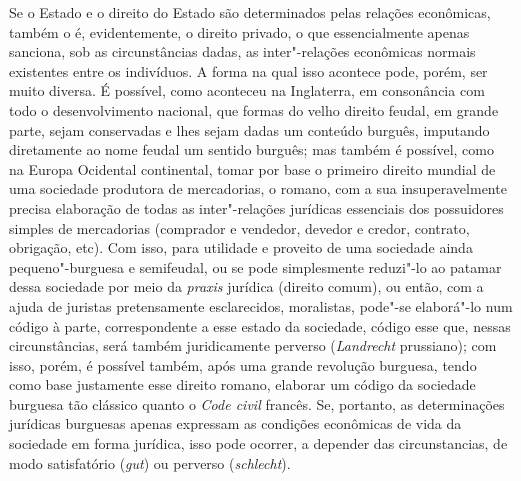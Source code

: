 Se o Estado e o direito do Estado são determinados pelas relações
econômicas, também o é, evidentemente, o direito privado, o que
essencialmente apenas sanciona, sob as circunstâncias dadas, as
inter"-relações econômicas normais existentes entre os indivíduos. A
forma na qual isso acontece pode, porém, ser muito diversa. É possível,
como aconteceu na Inglaterra, em consonância com todo o desenvolvimento
nacional, que formas do velho direito feudal, em grande parte, sejam
conservadas e lhes sejam dadas um conteúdo burguês, imputando
diretamente ao nome feudal um sentido burguês; mas também é possível,
como na Europa Ocidental continental, tomar por base o primeiro direito
mundial de uma sociedade produtora de mercadorias, o romano, com a sua
insuperavelmente precisa elaboração de todas as inter"-relações jurídicas
essenciais dos possuidores simples de mercadorias (comprador e vendedor,
devedor e credor, contrato, obrigação, etc). Com isso, para utilidade e
proveito de uma sociedade ainda pequeno"-burguesa e semifeudal, ou se
pode simplesmente reduzi"-lo ao patamar dessa sociedade por meio da
\emph{praxis} jurídica (direito comum), ou então, com a ajuda de
juristas pretensamente esclarecidos, moralistas, pode"-se elaborá"-lo num
código à parte, correspondente a esse estado da sociedade, código esse
que, nessas circunstâncias, será também juridicamente perverso
(\emph{Landrecht} prussiano); com isso,
porém, é possível também, após uma grande revolução burguesa, tendo como
base justamente esse direito romano, elaborar um código da sociedade
burguesa tão clássico quanto o \emph{Code
civil} francês. Se, portanto, as
determinações jurídicas burguesas apenas expressam as condições
econômicas de vida da sociedade em forma jurídica, isso pode ocorrer, a
depender das circunstancias, de modo satisfatório (\emph{gut}) ou
perverso (\emph{schlecht}).

